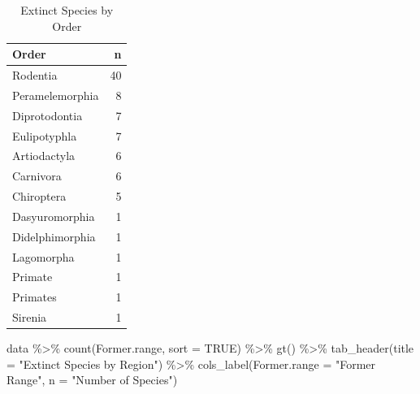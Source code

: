 \documentclass[
  letterpaper,
  DIV=11,
  numbers=noendperiod]{scrartcl}
\newenvironment{Shaded}{\begin{snugshade}}{\end{snugshade}}
\newcommand{\AttributeTok}[1]{\textcolor[rgb]{0.40,0.45,0.13}{#1}}
\newcommand{\ConstantTok}[1]{\textcolor[rgb]{0.56,0.35,0.01}{#1}}
\newcommand{\FunctionTok}[1]{\textcolor[rgb]{0.28,0.35,0.67}{#1}}
\newcommand{\NormalTok}[1]{\textcolor[rgb]{0.00,0.23,0.31}{#1}}
\newcommand{\SpecialCharTok}[1]{\textcolor[rgb]{0.37,0.37,0.37}{#1}}
\newcommand{\StringTok}[1]{\textcolor[rgb]{0.13,0.47,0.30}{#1}}
\begin{document}
\begin{table}
\caption*{
{\large Extinct Species by Order}
} 
\fontsize{12.0pt}{14.4pt}\selectfont
\begin{tabular*}{\linewidth}{@{\extracolsep{\fill}}lr}
\toprule
Order & n \\ 
\midrule\addlinespace[2.5pt]
Rodentia & 40 \\ 
Peramelemorphia & 8 \\ 
Diprotodontia & 7 \\ 
Eulipotyphla & 7 \\ 
Artiodactyla & 6 \\ 
Carnivora & 6 \\ 
Chiroptera & 5 \\ 
Dasyuromorphia & 1 \\ 
Didelphimorphia & 1 \\ 
Lagomorpha & 1 \\ 
Primate & 1 \\ 
Primates & 1 \\ 
Sirenia & 1 \\ 
\bottomrule
\end{tabular*}
\end{table}

\begin{Shaded}
\begin{Highlighting}[]
\NormalTok{data }\SpecialCharTok{\%\textgreater{}\%}
  \FunctionTok{count}\NormalTok{(Former.range, }\AttributeTok{sort =} \ConstantTok{TRUE}\NormalTok{) }\SpecialCharTok{\%\textgreater{}\%}
  \FunctionTok{gt}\NormalTok{() }\SpecialCharTok{\%\textgreater{}\%}
  \FunctionTok{tab\_header}\NormalTok{(}\AttributeTok{title =} \StringTok{"Extinct Species by Region"}\NormalTok{) }\SpecialCharTok{\%\textgreater{}\%}
  \FunctionTok{cols\_label}\NormalTok{(}\AttributeTok{Former.range =} \StringTok{"Former Range"}\NormalTok{, }\AttributeTok{n =} \StringTok{"Number of Species"}\NormalTok{)}
\end{Highlighting}
\end{Shaded}
\end{document}
